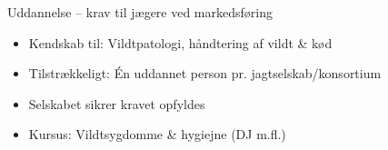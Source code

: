 \begin{frame}{Uddannelse – krav til jægere ved markedsføring}
    \begin{itemize}
        \item Kendskab til: Vildtpatologi, håndtering af vildt \& kød
        \item Tilstrækkeligt: Én uddannet person pr. jagtselskab/konsortium
        \item Selskabet sikrer kravet opfyldes
        \item Kursus: Vildtsygdomme \& hygiejne (DJ m.fl.)
    \end{itemize}
\end{frame}